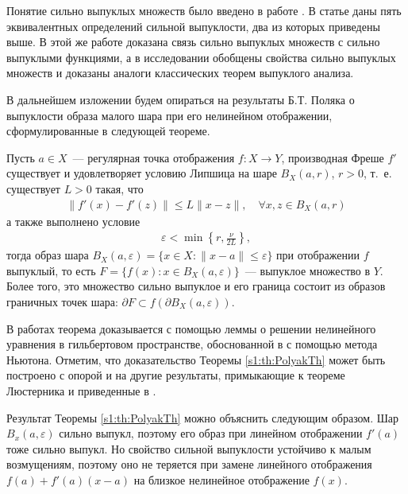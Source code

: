 \documentclass[../main.tex]{subfiles}
\begin{document}
Понятие сильно выпуклых множеств было введено в работе \cite{Polyak1966}.
В статье \cite{vial} даны пять эквивалентных определений сильной выпуклости, два из которых приведены выше. 
В этой же работе доказана связь сильно выпуклых множеств с сильно выпуклыми функциями, а в исследовании \cite{Polovinkin} обобщены свойства сильно выпуклых множеств и доказаны аналоги классических теорем выпуклого анализа.

В дальнейшем изложении будем опираться на результаты Б.Т. Поляка о выпуклости образа малого шара при его нелинейном отображении, сформулированные в следующей теореме. 
\begin{theorem}\label{s1:th:PolyakTh}
 Пусть $a \in X$~--- регулярная точка отображения $f: X \rightarrow Y$, производная Фреше $f'$ существует и удовлетворяет условию Липшица на шаре $B_X(a,r) $, $r > 0$, т.~е. существует $ L > 0 $ такая, что
 \begin{gather*}%
 \| f'(x) - f'(z) \| \leqslant L \| x - z \|, \quad \forall x,z \in B_X(a,r)
 \end{gather*}
 а также выполнено условие
 \begin{gather*}
 \varepsilon < \min\left\{r,\frac{\nu}{2L}\right\},
 \end{gather*}
 тогда образ шара $B_X(a,\varepsilon) = \{x \in X: \| x - a\| \leqslant \varepsilon\}$ при отображении $f$ выпуклый, то есть $F = \{f(x): x \in B_X(a,\varepsilon)\}$~--- выпуклое множество в $Y$.
 Более того, это множество сильно выпуклое и его граница состоит из образов граничных точек шара: $\partial F \subset f(\partial B_X(a,\varepsilon))$.
\end{theorem}
 
В работах \cite{Polyak2001, Polyak2001ru} теорема доказывается с помощью леммы о решении нелинейного уравнения в гильбертовом пространстве, обоснованной в \cite{Polyak1964} с помощью метода Ньютона.
Отметим, что доказательство Теоремы \ref{s1:th:PolyakTh} может быть построено с опорой и на другие результаты, примыкающие к теореме Люстерника и приведенные в \cite{Dmitruk1980, Ioffe}.
 
Результат Теоремы \ref{s1:th:PolyakTh} можно объяснить следующим образом.
Шар $B_x(a,\varepsilon)$ сильно выпукл, поэтому его образ при линейном отображении $f'(a)$ тоже сильно выпукл.
Но свойство сильной выпуклости устойчиво к малым возмущениям, поэтому оно не теряется при замене линейного отображения $f(a) + f'(a)(x - a)$ на близкое нелинейное отображение $f(x)$. 
 
\end{document}
